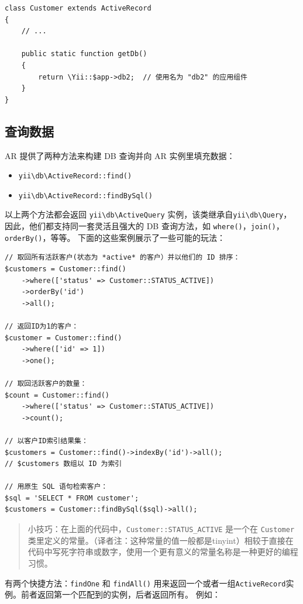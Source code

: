 \lstset{language=php}\begin{lstlisting}
class Customer extends ActiveRecord
{
    // ...

    public static function getDb()
    {
        return \Yii::$app->db2;  // 使用名为 "db2" 的应用组件
    }
}
\end{lstlisting}
\subsection{查询数据}
AR 提供了两种方法来构建 DB 查询并向 AR 实例里填充数据：

\begin{itemize}
\item \texttt{yii{\allowbreak{}\textbackslash}db{\allowbreak{}\textbackslash}ActiveRecord\allowbreak{}::\allowbreak{}find()}
\item \texttt{yii{\allowbreak{}\textbackslash}db{\allowbreak{}\textbackslash}ActiveRecord\allowbreak{}::\allowbreak{}findBySql()}
\end{itemize}
以上两个方法都会返回 \texttt{yii{\allowbreak{}\textbackslash}db{\allowbreak{}\textbackslash}ActiveQuery} 实例，该类继承自\texttt{yii{\allowbreak{}\textbackslash}db{\allowbreak{}\textbackslash}Query}，
因此，他们都支持同一套灵活且强大的 DB 查询方法，如 \lstinline|where()|，\lstinline|join()|，\lstinline|orderBy()|，等等。 
下面的这些案例展示了一些可能的玩法：

\lstset{language=php}\begin{lstlisting}
// 取回所有活跃客户(状态为 *active* 的客户）并以他们的 ID 排序：
$customers = Customer::find()
    ->where(['status' => Customer::STATUS_ACTIVE])
    ->orderBy('id')
    ->all();

// 返回ID为1的客户：
$customer = Customer::find()
    ->where(['id' => 1])
    ->one();

// 取回活跃客户的数量：
$count = Customer::find()
    ->where(['status' => Customer::STATUS_ACTIVE])
    ->count();

// 以客户ID索引结果集：
$customers = Customer::find()->indexBy('id')->all();
// $customers 数组以 ID 为索引

// 用原生 SQL 语句检索客户：
$sql = 'SELECT * FROM customer';
$customers = Customer::findBySql($sql)->all();
\end{lstlisting}
\begin{quote}小技巧：在上面的代码中，\lstinline|Customer::STATUS_ACTIVE| 是一个在 \lstinline|Customer| 类里定义的常量。（译者注：这种常量的值一般都是tinyint）相较于直接在代码中写死字符串或数字，使用一个更有意义的常量名称是一种更好的编程习惯。

\end{quote}
有两个快捷方法：\lstinline|findOne| 和 \lstinline|findAll()| 用来返回一个或者一组\lstinline|ActiveRecord|实例。前者返回第一个匹配到的实例，后者返回所有。
例如：

